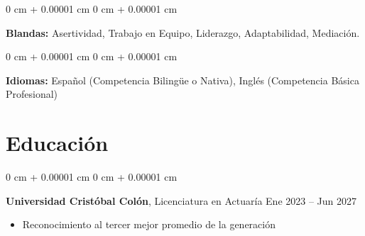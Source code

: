 \documentclass[10pt, letterpaper]{article}
\newenvironment{highlights}{
    \begin{itemize}[
        topsep=0.10 cm,
        parsep=0.10 cm,
        partopsep=0pt,
        itemsep=0pt,
        leftmargin=0 cm + 10pt
    ]
}{
    \end{itemize}
} %
\newenvironment{onecolentry}{
    \begin{adjustwidth}{
        0 cm + 0.00001 cm
    }{
        0 cm + 0.00001 cm
    }
}{
    \end{adjustwidth}
} %
\newenvironment{twocolentry}[2][]{
    \onecolentry
    \def\secondColumn{#2}
    \setcolumnwidth{\fill, 4.5 cm}
    \begin{paracol}{2}
}{
    \switchcolumn \raggedleft \secondColumn
    \end{paracol}
    \endonecolentry
} %
\begin{document}
        \vspace{0.2 cm}

        \begin{onecolentry}
            \textbf{Blandas:} Asertividad, Trabajo en Equipo, Liderazgo, Adaptabilidad, Mediación.
        \end{onecolentry}

        \vspace{0.2 cm}

        \begin{onecolentry}
            \textbf{Idiomas:} Español (Competencia Bilingüe o Nativa), Inglés (Competencia Básica Profesional)
        \end{onecolentry}

        


    \section{Educación}
        
        \begin{twocolentry}{
            Ene 2023 – Jun 2027
        }
            \textbf{Universidad Cristóbal Colón}, Licenciatura en Actuaría\end{twocolentry}
                \begin{highlights}
                    \item Reconocimiento al tercer mejor promedio de la generación
                \end{highlights}    
        \vspace{0.10 cm}
\end{document}
